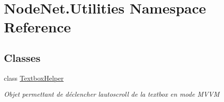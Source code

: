 \hypertarget{namespace_node_net_1_1_utilities}{}\section{Node\+Net.\+Utilities Namespace Reference}
\label{namespace_node_net_1_1_utilities}
\subsection*{Classes}
\begin{DoxyCompactItemize}
\item 
class \hyperlink{class_node_net_1_1_utilities_1_1_textbox_helper}{Textbox\+Helper}
\begin{DoxyCompactList}\small\item\em Objet permettant de déclencher l\textquotesingle{}autoscroll de la textbox en mode M\+V\+VM \end{DoxyCompactList}\end{DoxyCompactItemize}
